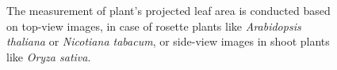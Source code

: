 \documentclass[paper=A4,bibliography=totocnumbered]{scrartcl}
\begin{document}
\begin{figure}
	\centering
	\qquad
	\caption[Measurement of plant's projected leaf area]{The measurement of plant's projected leaf area is conducted based on top-view images, in case of rosette plants like \textit{Arabidopsis thaliana} or \textit{Nicotiana tabacum}, or side-view images in shoot plants like \textit{Oryza sativa}.}
	\label{fig:PLA}
\end{figure}
\end{document}
